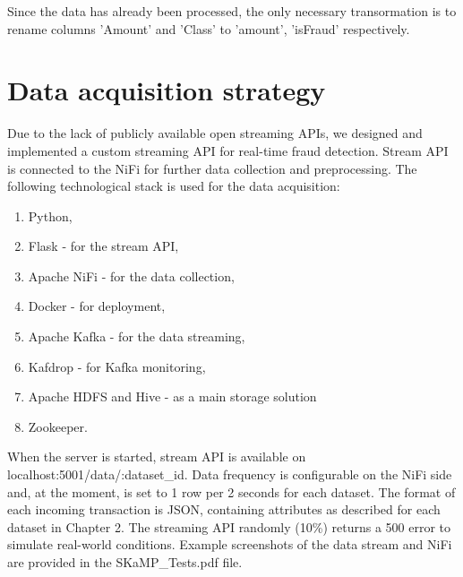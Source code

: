 \documentclass[12pt,a4paper, hidelinks]{article}
\begin{document}
Since the data has already been processed, the only necessary transormation is to rename columns 'Amount' and 'Class' to 'amount', 'isFraud' respectively.

\newpage

\section{Data acquisition strategy}

Due to the lack of publicly available open streaming APIs, we designed and implemented a custom streaming API for real-time fraud detection. Stream API is connected to the NiFi for further data collection and preprocessing. The following technological stack is used for the data acquisition:

\begin{enumerate}
    \item Python,
    \item Flask  - for the stream API,
    \item Apache NiFi - for the data collection,
    \item Docker - for deployment,
    \item Apache Kafka - for the data streaming,
    \item Kafdrop - for Kafka monitoring,
    \item Apache HDFS and Hive - as a main storage solution
    \item Zookeeper.
\end{enumerate}

When the server is started, stream API is available on localhost:5001/data/:dataset\_id. Data frequency is configurable on the NiFi side and, at the moment, is set to 1 row per 2 seconds for each dataset. The format of each incoming transaction is JSON, containing attributes as described for each dataset in Chapter 2. The streaming API randomly (10\%) returns a 500 error to simulate real-world conditions. Example screenshots of the data stream and NiFi are provided in the SKaMP\_Tests.pdf file.
\end{document}
